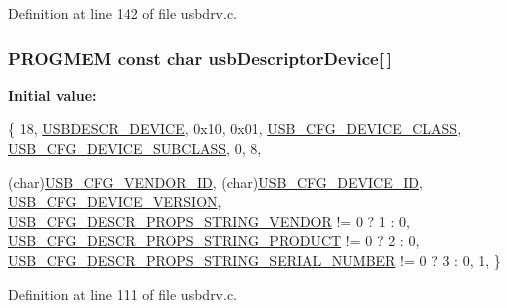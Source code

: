 Definition at line 142 of file usbdrv.\-c.

\hypertarget{mhvlib-_vusb-_console_2vusb_2usbdrv_8c_a1b8593e30029ecfd59a89335a12db631}{
\subsubsection[{usb\-Descriptor\-Device}]{\setlength{\rightskip}{0pt plus 5cm}P\-R\-O\-G\-M\-E\-M const char usb\-Descriptor\-Device\mbox{[}$\,$\mbox{]}}}\label{mhvlib-_vusb-_console_2vusb_2usbdrv_8c_a1b8593e30029ecfd59a89335a12db631}
{\bfseries Initial value\-:}
\begin{DoxyCode}
 \{    
    18,         
    \hyperlink{mhvlib-_vusb-_keyboard_2vusb_2usbdrv_8h_a5b76593f7b6295a4a599aba4476ec258}{USBDESCR\_DEVICE},        
    0x10, 0x01,             
    \hyperlink{mhvlib-_vusb-_keyboard_2vusb_2usbconfig-prototype_8h_a9ce4f96ad98b3db8205691e8bc723e55}{USB\_CFG\_DEVICE\_CLASS},
    \hyperlink{mhvlib-_vusb-_keyboard_2vusb_2usbconfig-prototype_8h_a89e5ad66f8b835866e7d836c73bfd30d}{USB\_CFG\_DEVICE\_SUBCLASS},
    0,                      
    8,                      
    
    (char)\hyperlink{mhvlib-_vusb-_keyboard_2vusb_2usbconfig-prototype_8h_a9326b8ec9f809ce66d54349691646930}{USB\_CFG\_VENDOR\_ID},
    (\textcolor{keywordtype}{char})\hyperlink{mhvlib-_vusb-_keyboard_2vusb_2usbconfig-prototype_8h_abc740455309399430b0f49bf7931d1d7}{USB\_CFG\_DEVICE\_ID},
    \hyperlink{mhvlib-_vusb-_keyboard_2vusb_2usbconfig-prototype_8h_aba3c7c0cd4055ba3bbf5df38e57b6d27}{USB\_CFG\_DEVICE\_VERSION}, 
    \hyperlink{mhvlib-_vusb-_console_2vusb_2usbdrv_8c_a55edf2117128387162339d98ba2af0f4}{USB\_CFG\_DESCR\_PROPS\_STRING\_VENDOR} != 0 ? 1
       : 0,         
    \hyperlink{mhvlib-_vusb-_console_2vusb_2usbdrv_8c_aa08084f9755a643e02d469b66b129ef6}{USB\_CFG\_DESCR\_PROPS\_STRING\_PRODUCT} != 0 ?
       2 : 0,        
    \hyperlink{mhvlib-_vusb-_console_2vusb_2usbdrv_8c_a82224c07d3a1f9fcccbff70b71c8ea51}{USB\_CFG\_DESCR\_PROPS\_STRING\_SERIAL\_NUMBER}
       != 0 ? 3 : 0,  
    1,          
\}
\end{DoxyCode}


Definition at line 111 of file usbdrv.\-c.

